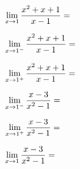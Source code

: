 \documentclass{ximera}
\begin{document}
\begin{exercise}
\begin{question}
\begin{feedback}[1<0]
			\end{feedback}
		\end{question}
		\begin{question} \def\isE{correct}   $\limxg{1}    \dfrac{x^2+x+1}{x-1}= \;$            \localoefoptions \end{question}
		\begin{question} \def\isB{correct}   $\llimxg{1}    \dfrac{x^2+x+1}{x-1}= \;$            \localoefoptions \end{question}
		\begin{question} \def\isA{correct}   $\rlimxg{1}    \dfrac{x^2+x+1}{x-1}= \;$            \localoefoptions \end{question}
		\begin{question} \def\isA{correct}   $\llimxg{1}    \dfrac{x-3}{x^2-1}= \;$            \localoefoptions \end{question}
		\begin{question} \def\isB{correct}   $\rlimxg{1}    \dfrac{x-3}{x^2-1}= \;$            \localoefoptions \end{question}
		\begin{question} \def\isE{correct}   $\limxg{1}    \dfrac{x-3}{x^2-1}= \;$            \localoefoptions \end{question}
				
\end{exercise}
\end{document}
